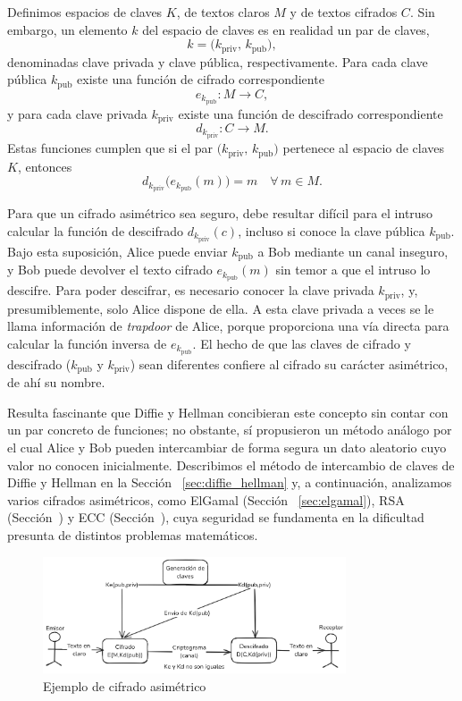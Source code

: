 Definimos espacios de claves \(K\), de textos claros \(M\) y de textos cifrados \(C\). Sin embargo, un elemento \(k\) del espacio de claves es en realidad un par de claves,
\[
k = \bigl(k_{\text{priv}},\,k_{\text{pub}}\bigr),
\]
denominadas clave privada y clave pública, respectivamente. Para cada clave pública \(k_{\text{pub}}\) existe una función de cifrado correspondiente
\[
e_{k_{\text{pub}}}: M \longrightarrow C,
\]
y para cada clave privada \(k_{\text{priv}}\) existe una función de descifrado correspondiente
\[
d_{k_{\text{priv}}}: C \longrightarrow M.
\]
Estas funciones cumplen que si el par \(\bigl(k_{\text{priv}},\,k_{\text{pub}}\bigr)\) pertenece al espacio de claves \(K\), entonces
\[
d_{k_{\text{priv}}}\bigl(e_{k_{\text{pub}}}(m)\bigr) = m
\quad\forall\,m \in M.
\]

Para que un cifrado asimétrico sea seguro, debe resultar difícil para el intruso calcular la función de descifrado \(d_{k_{\text{priv}}}(c)\), incluso si conoce la clave pública \(k_{\text{pub}}\). Bajo esta suposición, Alice puede enviar \(k_{\text{pub}}\) a Bob mediante un canal inseguro, y Bob puede devolver el texto cifrado \(e_{k_{\text{pub}}}(m)\) sin temor a que el intruso lo descifre. Para poder descifrar, es necesario conocer la clave privada \(k_{\text{priv}}\), y, presumiblemente, solo Alice dispone de ella. A esta clave privada a veces se le llama información de \emph{trapdoor} de Alice, porque proporciona una vía directa para calcular la función inversa de \(e_{k_{\text{pub}}}\). El hecho de que las claves de cifrado y descifrado (\(k_{\text{pub}}\) y \(k_{\text{priv}}\)) sean diferentes confiere al cifrado su carácter asimétrico, de ahí su nombre.

Resulta fascinante que Diffie y Hellman concibieran este concepto sin contar con un par concreto de funciones; no obstante, sí propusieron un método análogo por el cual Alice y Bob pueden intercambiar de forma segura un dato aleatorio cuyo valor no conocen inicialmente. Describimos el método de intercambio de claves de Diffie y Hellman en la Sección ~\ref{sec:diffie_hellman} y, a continuación, analizamos varios cifrados asimétricos, como ElGamal (Sección ~\ref{sec:elgamal}), RSA (Sección~) y ECC (Sección~), cuya seguridad se fundamenta en la dificultad presunta de distintos problemas matemáticos.

\begin{figure}[H]
    \centering
    \includegraphics[width=0.8\textwidth]{imagenes/Cifrado_asimetrico.png}
    \caption{Ejemplo de cifrado asimétrico}
    \label{fig:cifrado_asimetrico}
\end{figure}

